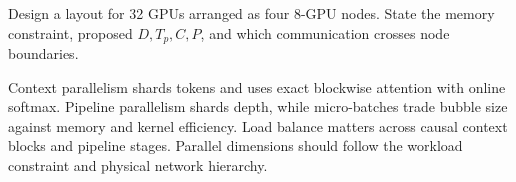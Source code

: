 \documentclass[handout]{beamer}
\begin{document}
  {Design a layout for 32 GPUs arranged as four 8-GPU nodes. State the memory constraint, proposed $D,T_p,C,P$, and which communication crosses node boundaries.}

\takeaways
  {Context parallelism shards tokens and uses exact blockwise attention with online softmax.}
  {Pipeline parallelism shards depth, while micro-batches trade bubble size against memory and kernel efficiency.}
  {Load balance matters across causal context blocks and pipeline stages.}
  {Parallel dimensions should follow the workload constraint and physical network hierarchy.}
\end{document}
